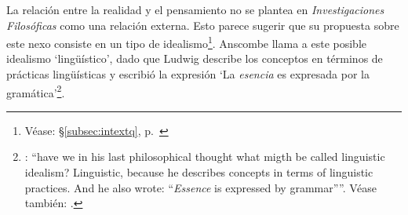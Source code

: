 La relación entre la realidad y el pensamiento no se plantea en \emph{Investigaciones Filosóficas} como una relación externa. Esto parece sugerir que su propuesta sobre este nexo consiste en un tipo de idealismo\footnote{Véase: \S\ref{subsec:intextq}, p.~\pageref{subsec:intextq}}.
Anscombe llama a este posible idealismo `lingüístico', dado que Ludwig describe los conceptos en términos de prácticas lingüísticas y escribió la expresión \enquote*{La \emph{esencia} es expresada por la gramática}\footnote{\Cite[Cf.][112]{anscombe1981parmenides:qli}: \enquote{have we in his last philosophical thought what migth be called linguistic idealism? Linguistic, because he describes concepts in terms of linguistic practices. And he also wrote: ``\emph{Essence} is expressed by grammar''}. Véase también: \Cite[Cf.][II,\S365]{wittgenstein1953phiinv}.}. 

